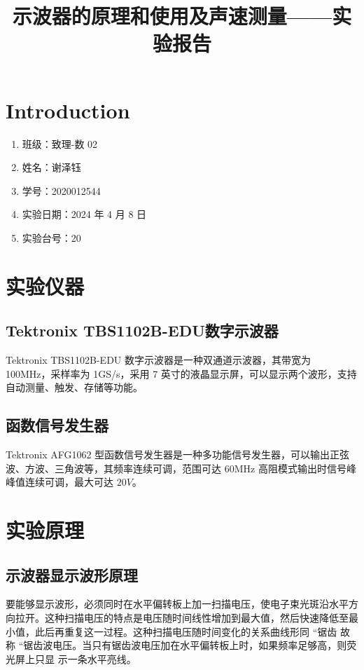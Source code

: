 \documentclass[12pt,a4paper]{amsart}
\title{示波器的原理和使用及声速测量——实验报告}
\begin{document}
\maketitle

\section{Introduction}

\begin{enumerate}
  \item 班级：致理-数 02
  \item 姓名：谢泽钰
  \item 学号：2020012544
  \item 实验日期：2024 年 4 月 8 日
  \item 实验台号：20
\end{enumerate}


\section{实验仪器}

\subsection{Tektronix TBS1102B-EDU数字示波器}

Tektronix TBS1102B-EDU 数字示波器是一种双通道示波器，其带宽为 100MHz，采样率为 1GS/s，采用 7 英寸的液晶显示屏，可以显示两个波形，支持自动测量、触发、存储等功能。

\subsection{函数信号发生器}

Tektronix AFG1062 型函数信号发生器是一种多功能信号发生器，可以输出正弦波、方波、三角波等，其频率连续可调，范围可达 60MHz 高阻模式输出时信号峰峰值连续可调，最大可达 $20V$。

\section{实验原理}

\subsection{示波器显示波形原理}

要能够显示波形，必须同时在水平偏转板上加一扫描电压，使电子束光斑沿水平方向拉开。这种扫描电压的特点是电压随时间线性增加到最大值，然后快速降低至最小值，此后再重复这一过程。这种扫描电压随时间变化的关系曲线形同 “锯齿 故称 “锯齿波电压。当只有锯齿波电压加在水平偏转板上时，如果频率足够高，则荧光屏上只显
示一条水平亮线。\\
\end{document}
